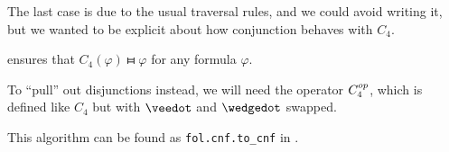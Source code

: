 \begin{algorithm}
\begin{thmenum}
    The last case is due to the usual traversal rules, and we could avoid writing it, but we wanted to be explicit about how conjunction behaves with \( C_4 \).

     ensures that \( C_4(\varphi) \gleichstark \varphi \) for any formula \( \varphi \).

    To \enquote{pull} out disjunctions instead, we will need the operator \( C_4^{op} \), which is defined like \( C_4 \) but with \( \synvee \) and \( \synwedge \) swapped.
  \end{thmenum}
\end{algorithm}
\begin{comments}
  \item This algorithm can be found as \texttt{fol.cnf.to\_cnf} in \cite{code}.
\end{comments}
